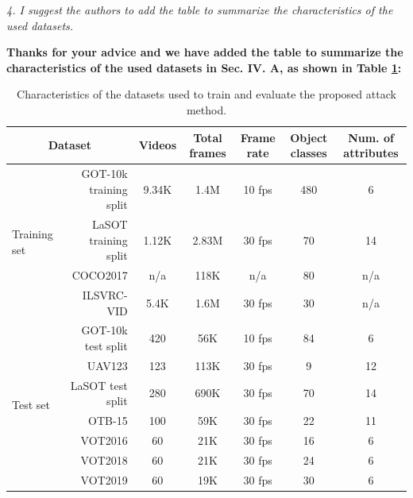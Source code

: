 \documentclass[12pt]{article}
\begin{document}
\textit{4. I suggest the authors to add the table to summarize the characteristics of the used datasets.}

\textbf{Thanks for your advice and we have added the table to summarize the characteristics of the used datasets in Sec. IV. A, as shown in Table \ref{tab:dataset}:}

\begin{table}[h]
    \caption{Characteristics of the datasets used to train and evaluate the proposed attack method.}
    \begin{tabular}{lrccccc} \toprule
    \multicolumn{2}{c}{Dataset}                            & Videos & Total frames & Frame rate & Object classes & Num. of attributes \\ \midrule
    \multirow{4}{*}{Training set} & GOT-10k training split & 9.34K & 1.4M        & 10 fps     & 480            & 6                  \\
                                  & LaSOT training split   & 1.12K & 2.83M        & 30 fps     & 70             & 14                 \\
                                  & COCO2017               & n/a    & 118K         & n/a        & 80             & n/a                \\
                                  & ILSVRC-VID             & 5.4K  & 1.6M         & 30 fps     & 30             & n/a                \\ \midrule
    \multirow{7}{*}{Test set}     & GOT-10k test split     & 420    & 56K          & 10 fps     & 84             & 6                  \\
                                  & UAV123                 & 123    & 113K         & 30 fps     & 9              & 12                 \\
                                  & LaSOT test split       & 280    & 690K         & 30 fps     & 70             & 14                 \\
                                  & OTB-15                 & 100    & 59K          & 30 fps     & 22             & 11                 \\
                                  & VOT2016                & 60     & 21K          & 30 fps     & 16             & 6                  \\
                                  & VOT2018                & 60     & 21K          & 30 fps     & 24             & 6                  \\ 
                                  & VOT2019                & 60     & 19K          & 30 fps     & 30             & 6                  \\ \bottomrule
    \end{tabular}
    \label{tab:dataset}
\end{table}
\end{document}
